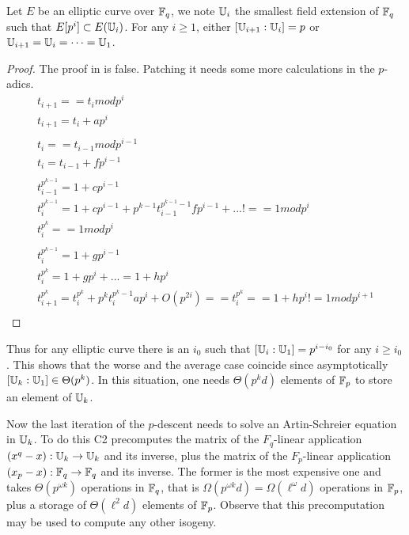 \begin{proposition}
  \label{th:tower}
  Let $E$ be an elliptic curve over $\mathbb{F}_q$, we note $\mathbb{U}_i$ the
  smallest field extension of $\mathbb{F}_q$ such that $E[p^i]\subset
  E(\mathbb{U}_i)$. For any $i\ge1$, either $[\mathbb{U}_{i+1}:\mathbb{U}_i] = p$ or
  $\mathbb{U}_{i+1}=\mathbb{U}_i=\cdots=\mathbb{U}_1$.
\end{proposition}
\begin{proof}
  The proof in \cite{Ler97} is false. Patching it needs some more
  calculations in the $p$-adics.
  \begin{gather}
    t_{i+1} == t_i mod p^i\\
    t_{i+1} = t_i + ap^i\\
    \\
    t_i == t_{i-1} mod p^{i-1}\\
    t_i = t_{i-1} + fp^{i-1}\\
    \\
    t_{i-1}^{p^{k-1}} = 1 + cp^{i-1}\\
    t_i^{p^{k-1}} = 1 + cp^{i-1} + p^{k-1}t_{i-1}^{p^{k-1}-1}fp^{i-1} + ... !== 1 mod p^i\\
    t_i^{p^k} == 1 mod p^i\\
    \\
    t_i^{p^{k-1}} = 1 + gp^{i-1} \\
    t_i^{p^k} = 1 + gp^{i} + ... = 1 + hp^{i}\\
    t_{i+1}^{p^k} = t_i^{p^k} + p^kt_i^{p^k-1}ap^i + O(p^{2i}) == t_i^{p^k} == 1 + hp^i != 1 mod p^{i+1}\\
  \end{gather}
\end{proof}

Thus for any elliptic curve there is an $i_0$ such that $[\mathbb{U}_i:\mathbb{U}_1] =
p^{i-i_0}$ for any $i \ge i_0$. This shows that the worse and the
average case coincide since asymptotically $[\mathbb{U}_k:\mathbb{U}_1] \in
\Theta(p^k)$. In this situation, one needs $\Theta(p^kd)$ elements of
$\mathbb{F}_p$ to store an element of $\mathbb{U}_k$.

Now the last iteration of the $p$-descent needs to solve an
Artin-Schreier equation in $\mathbb{U}_k$. To do this C2 precomputes the
matrix of the $F_q$-linear application $(x^q-x):\mathbb{U}_k\rightarrow\mathbb{U}_k$
and its inverse, plus the matrix of the $F_p$-linear application
$(x_p-x):\mathbb{F}_q\rightarrow\mathbb{F}_q$ and its inverse. The former is the most
expensive one and takes $\Theta(p^{\omega k})$ operations in $\mathbb{F}_q$,
that is $\Omega(p^{\omega k}d) = \Omega(\ell^\omega d)$ operations in
$\mathbb{F}_p$, plus a storage of $\Theta(\ell^2d)$ elements of
$\mathbb{F}_p$. Observe that this precomputation may be used to compute any
other isogeny.

